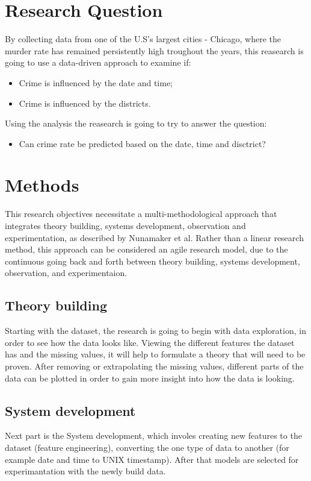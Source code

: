 \documentclass[a4paper, twocolumn]{article}
\begin{document}
\section{Research Question}
By collecting data from one of the U.S's largest cities - Chicago,
where the murder rate has remained persistently high troughout the years\cite{friedman2017crime},
this reasearch is going to use a data-driven approach to examine if:
\begin{itemize}
    \item Crime is influenced by the date and time;
    \item Crime is influenced by the districts.
\end{itemize}
Using the analysis the reasearch is going to try to answer the question:
\begin{itemize}
    \item Can crime rate be predicted based on the date, time and disctrict?
\end{itemize}

\section{Methods}

This research objectives necessitate a multi-methodological approach that integrates theory building, systems development, observation and experimentation, as described by Nunamaker et al\cite{nunamaker1990systems}.
Rather than a linear research method, this approach can be considered an agile research model, due to the continuous going back and forth between theory building, systems development, observation, and experimentaion.

\subsection{Theory building}
\label{theorybuilding}
    Starting with the dataset\cite{dataset}, the research is going to begin with data exploration,
    in order to see how the data looks like. Viewing the different features the dataset has and the missing
    values, it will help to formulate a theory that will need to be proven.
    After removing or extrapolating the missing values, different parts of the data can be plotted in order
    to gain more insight into how the data is looking.
\subsection{System development}
\label{systemdevelopment}
    Next part is the System development, which involes creating new features to the dataset (feature engineering),
    converting the one type of data to another (for example date and time to UNIX timestamp).
    After that models are selected for experimantation with the newly build data.
\end{document}
